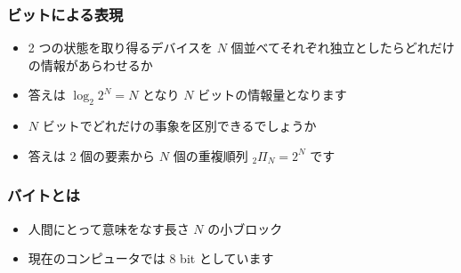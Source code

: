 \begin{frame}
\frametitle{ビットによる表現}
  \begin{itemize}
\item 2 つの状態を取り得るデバイスを $N$ 個並べてそれぞれ独立としたらどれだけの情報があらわせるか
\item 答えは \(\log_2 2^N=N\) となり $N$ ビットの情報量となります
\item $N$ ビットでどれだけの事象を区別できるでしょうか
\item 答えは 2 個の要素から $N$ 個の重複順列 \({ }_2\Pi_N=2^N\) です
  \end{itemize}
\end{frame}
\begin{frame}
\frametitle{バイトとは}
  \begin{itemize}
\item 人間にとって意味をなす長さ $N$ の小ブロック
\item 現在のコンピュータでは 8 bit としています
  \end{itemize}
\end{frame}
%
%
